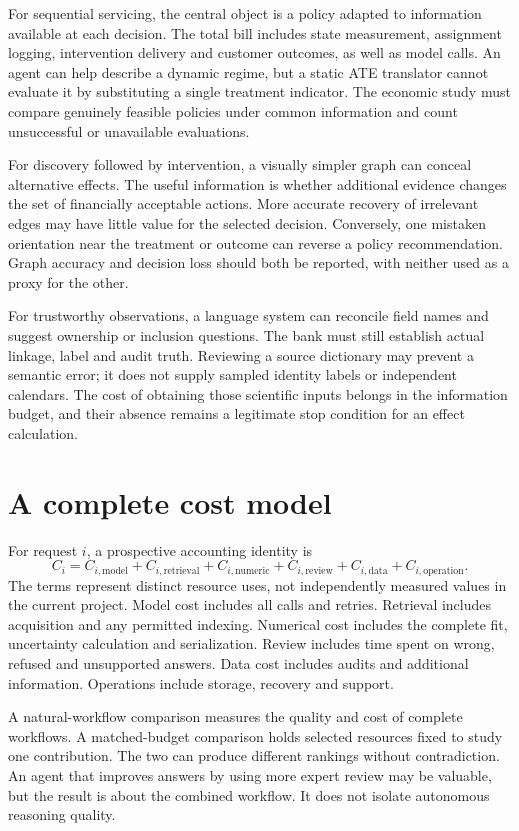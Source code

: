 For sequential servicing, the central object is a policy adapted to information
available at each decision. The total bill includes state measurement,
assignment logging, intervention delivery and customer outcomes, as well as
model calls. An agent can help describe a dynamic regime, but a static ATE
translator cannot evaluate it by substituting a single treatment indicator.
The economic study must compare genuinely feasible policies under common
information and count unsuccessful or unavailable evaluations.

For discovery followed by intervention, a visually simpler graph can conceal
alternative effects. The useful information is whether additional evidence
changes the set of financially acceptable actions. More accurate recovery of
irrelevant edges may have little value for the selected decision. Conversely,
one mistaken orientation near the treatment or outcome can reverse a policy
recommendation. Graph accuracy and decision loss should both be reported, with
neither used as a proxy for the other.

For trustworthy observations, a language system can reconcile field names and
suggest ownership or inclusion questions. The bank must still establish actual
linkage, label and audit truth. Reviewing a source dictionary may prevent a
semantic error; it does not supply sampled identity labels or independent
calendars. The cost of obtaining those scientific inputs belongs in the
information budget, and their absence remains a legitimate stop condition for
an effect calculation.

\section{A complete cost model}

For request $i$, a prospective accounting identity is
\[
 C_i=C_{i,\mathrm{model}}+C_{i,\mathrm{retrieval}}+
     C_{i,\mathrm{numeric}}+C_{i,\mathrm{review}}+
     C_{i,\mathrm{data}}+C_{i,\mathrm{operation}}.
\]
The terms represent distinct resource uses, not independently measured values
in the current project. Model cost includes all calls and retries. Retrieval
includes acquisition and any permitted indexing. Numerical cost includes the
complete fit, uncertainty calculation and serialization. Review includes time
spent on wrong, refused and unsupported answers. Data cost includes audits and
additional information. Operations include storage, recovery and support.

A natural-workflow comparison measures the quality and cost of complete
workflows. A matched-budget comparison holds selected resources fixed to study
one contribution. The two can produce different rankings without contradiction.
An agent that improves answers by using more expert review may be valuable,
but the result is about the combined workflow. It does not isolate autonomous
reasoning quality.

